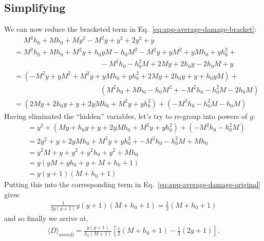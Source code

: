 \documentclass[../../main.tex]{subfiles}
\begin{document}
			\subsection{Simplifying}
				We can now reduce the bracketed term in Eq.~\ref{eq:app-average-damage-bracket}:
				\begin{align}
				 	&\phantom{=}M^2h_0+Mh_0+My^2                   -M^2y + y^3                                    +2y^2+y \\
				 	&=M^{2}h_{0}+Mh_{0}+M^{2}y+h_{0}yM-h_{0}M^{2}-M^{2}y+yM^{2}+yMh_{0}+yh_{0}^{2}+\\
				 		&\phantom{=========} -M^{2}h_{0}-h_{0}^{2}M+2My+2h_{0}y-2h_{0}M+y\\
				 	&=\left(-M^{2}y+yM^{2}+M^{2}y+yMh_{0}+yh_{0}^{2}+2My+2h_{0}y+y+h_{0}yM\right)+\\
				 		&\phantom{=========} \left(M^{2}h_{0}+Mh_{0}-h_{0}M^{2}+-M^{2}h_{0}-h_{0}^{2}M-2h_{0}M\right)\\
				 	&=\left(2My+2h_{0}y+y+2yMh_{0}+M^{2}y+yh_{0}^{2}\right)+\left(-M^{2}h_{0}-h_{0}^{2}M-h_{0}M\right)
				\end{align}
				Having eliminated the ``hidden'' variables, let's try to re-group into powers of $y$:
				\begin{align}
				 	&=y^{2}+\left(My+h_{0}y+y+2yMh_{0}+M^{2}y+yh_{0}^{2}\right)+\left(-M^{2}h_{0}-h_{0}^{2}M\right)\\
				 	&=2y^{2}+y+2yMh_{0}+M^{2}y+yh_{0}^{2}+-M^{2}h_{0}-h_{0}^{2}M+Mh_{0}\\
				 	&=y^{2}M+y+y^{2}+y^{2}h_{0}+y^{2}+Mh_{0}\\
				 	&=y\left(yM+yh_{0}+y+M+h_{0}+1\right)\\
				 	&=y\left(y+1\right)\left(M+h_{0}+1\right)
				\end{align}
				Putting this into the corresponding term in Eq.~\ref{eq:app-average-damage-original} gives
				\begin{align}
					\frac{1}{2y(y+1)}y(y+1)\left(M+h_{0}+1\right) = \frac{1}{2}\left(M+h_{0}+1\right)
				\end{align}
				and so finally we arrive at,
				\begin{align}
					\boxed{\langle D \rangle_\text{overall} = \frac{y(y+1)}{h_0({M+1})}\left[
						 \frac{1}{2}\left(M+h_{0} + 1\right) -\frac{1}{3}(2y+1)
					\right]}.
				\end{align}
		\newpage
\end{document}
